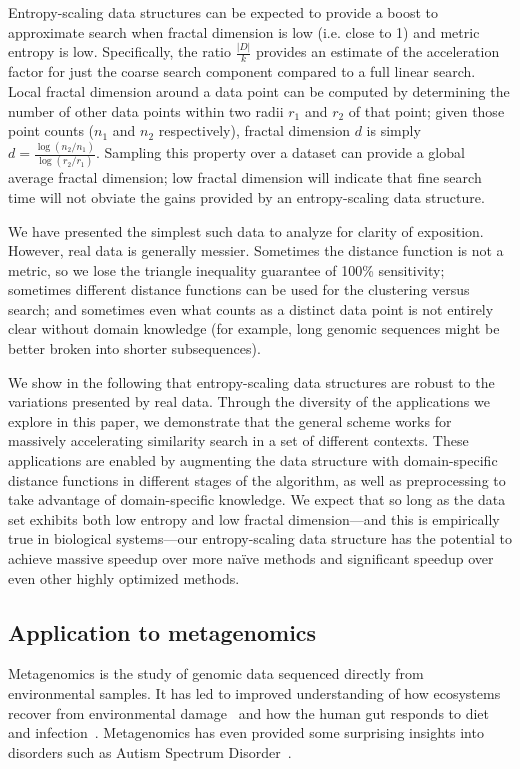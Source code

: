 \documentclass[review,preprint,12pt]{elsarticle}
\renewcommand{\cite}{\citep} %
\theoremstyle{definition}
\theoremstyle{remark}
\numberwithin{equation}{section}
\begin{document}
Entropy-scaling data structures can be expected to provide a boost to 
approximate search when fractal dimension is low (i.e. close to 1) and metric
entropy is low.
Specifically, the ratio $\frac{|D|}{k}$ provides an estimate of the acceleration factor
for just the coarse search component compared to a full linear search.
Local fractal dimension around a data point can be computed by determining the
number of other data points within two radii $r_1$ and $r_2$ of that point;
given those point counts ($n_1$ and $n_2$ respectively), fractal dimension $d$
is simply $d=\frac{\log (n_2 / n_1)}{ \log (r_2 / r_1)}$.
Sampling this property over a dataset can provide a global average fractal 
dimension; low fractal dimension will indicate that fine search time will not
obviate the gains provided by an entropy-scaling data structure.

We have presented the simplest such data to analyze for clarity of exposition.
However, real data is generally messier.
Sometimes the distance function is not a metric, so we lose the triangle inequality guarantee of 100\% sensitivity;
sometimes different distance functions can be used for the clustering versus search;
and sometimes even what counts as a distinct data point is not entirely clear without domain knowledge (for example, long genomic sequences might be better broken into shorter subsequences).

We show in the following that entropy-scaling data structures are robust to the variations presented by real data.
Through the diversity of the applications we explore in this paper, we demonstrate that the general scheme works for massively accelerating similarity search in a set of different contexts.
These applications are enabled by augmenting the data structure with domain-specific distance functions in different stages of the algorithm, as well as preprocessing to take advantage of domain-specific knowledge.
We expect that so long as the data set exhibits both low entropy and low 
fractal dimension---and this is empirically true in biological systems---our 
entropy-scaling data structure has the potential to achieve massive speedup 
over more na\"ive methods and significant speedup over even other highly 
optimized methods.

\subsection{Application to metagenomics}

Metagenomics is the study of genomic data sequenced directly from environmental
samples.
It has led to improved understanding of how ecosystems recover
from environmental damage~\cite{tyson2004community} and how the human gut responds 
to diet
and infection~\cite{david2014host}.
Metagenomics has even provided some surprising insights into disorders 
such as Autism Spectrum Disorder~\cite{macfabe2012short}.
\end{document}
